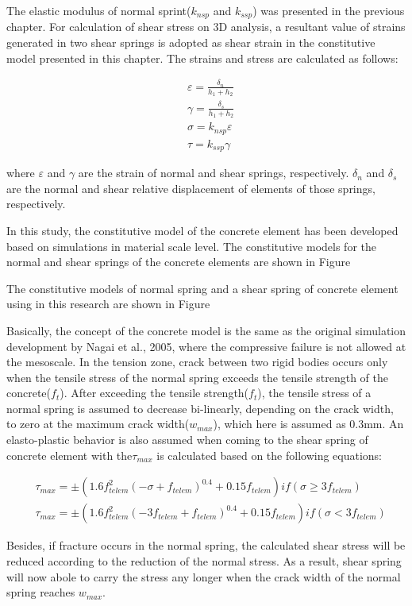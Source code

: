 The elastic modulus of normal sprint($k_{nsp}$ and $k_{ssp}$) was presented in the previous chapter. For calculation of shear stress on 3D analysis, a resultant value of strains generated in two shear springs is adopted as shear strain in the constitutive model presented in this chapter. The strains and stress are calculated as follows:

\begin{equation}
  \begin{aligned}
  &\varepsilon = \frac{\delta_n}{h_1 + h_2}\\
  &\gamma = \frac{\delta_s}{h_1 + h_2}\\
  &\sigma = k_{nsp}\varepsilon\\
  &\tau = k_{ssp}\gamma
  \end{aligned}
\end{equation}

where $\varepsilon$ and $\gamma$ are the strain of normal and shear springs, respectively. $\delta_n$ and $\delta_s$ are the normal and shear relative displacement of elements of those springs, respectively.

In this study, the constitutive model of the concrete element has been developed based on simulations in material scale level. The constitutive models for the normal and shear springs of the concrete elements are shown in Figure %


The constitutive models of normal spring and a shear spring of concrete element using in this research are shown in Figure %

Basically, the concept of the concrete model is the same as the original simulation development by Nagai et al., 2005, where the compressive failure is not allowed at the mesoscale. In the tension zone, crack between two rigid bodies occurs only when the tensile stress of the normal spring exceeds the tensile strength of the concrete($f_t$). After exceeding the tensile strength($f_t$), the tensile stress of a normal spring is assumed to decrease bi-linearly, depending on the crack width, to zero at the maximum crack width($w_{max}$), which here is assumed as 0.3mm. An elasto-plastic behavior is also assumed when coming to the shear spring of concrete element with the$\tau_{max}$ is calculated based on the following equations:

\begin{equation}
  \begin{aligned}
  &\tau_{max} = \pm (1.6f_{telem}^2 (-\sigma + f_{telem})^0.4 + 0.15f_{telem}) if (\sigma \geq 3f_{telem})\\
  &\tau_{max} = \pm (1.6f_{telem}^2 (-3f_{telem} + f_{telem})^0.4 + 0.15f_{telem}) if (\sigma < 3f_{telem})
  \end{aligned}
\end{equation}

Besides, if fracture occurs in the normal spring, the calculated shear stress will be reduced according to the reduction of the normal stress. As a result, shear spring will now abole to carry the stress any longer when the crack width of the normal spring reaches $w_{max}$.
